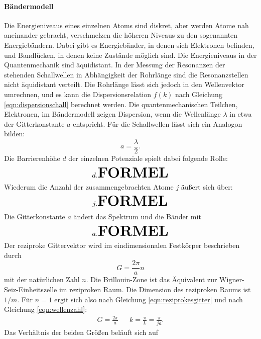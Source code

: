 \paragraph{Bändermodell}
Die Energieniveaus eines einzelnen Atoms sind diskret, aber werden Atome nah aneinander gebracht, verschmelzen die höheren Niveaus zu den sogenannten Energiebändern.
Dabei gibt es Energiebänder, in denen sich Elektronen befinden, und Bandlücken, in denen keine Zustände möglich sind.
Die Energieniveaus in der Quantenmechanik sind äquidistant.
In der Messung der Resonanzen der stehenden Schallwellen in Abhängigkeit der Rohrlänge sind die Resonanzstellen nicht äquidistant verteilt.
Die Rohrlänge lässt sich jedoch in den Wellenvektor umrechnen, und es kann die Dispersionsrelation $f(k)$ nach Gleichung \eqref{eqn:dispersionschall} berechnet werden.
Die quantenmechanischen Teilchen, Elektronen, im Bändermodell zeigen Dispersion, wenn die Wellenlänge $\lambda$ in etwa der Gitterkonstante $a$ entspricht.
Für die Schallwellen lässt sich ein Analogon bilden:
\begin{equation}
  a = \frac{\lambda}{2}.
\end{equation}
Die Barrierenhöhe $d$ der einzelnen Potenziale spielt dabei folgende Rolle:
\begin{equation}
  d. \textbf{\huge{FORMEL}}
\end{equation}
Wiederum die Anzahl der zusammengebrachten Atome $j$ äußert sich über:
\begin{equation}
  j. \huge{\textbf{FORMEL}}
\end{equation}
Die Gitterkonstante $a$ ändert das Spektrum und die Bänder mit
\begin{equation}
  a. \huge{\textbf{FORMEL}}
\end{equation}
Der reziproke Gittervektor wird im eindimensionalen Festkörper beschrieben durch
\begin{equation}
  G= \frac{2 \pi }{a} n
  \label{eqn:reziprokesgitter}
\end{equation}
mit der natürlichen Zahl $n$.
Die Brillouin-Zone ist das Äquivalent zur Wigner-Seiz-Einheitszelle im reziproken Raum.
Die Dimension des reziproken Raums ist $\si{1/m}$.
Für $n=1$ ergit sich also nach Gleichung \eqref{eqn:reziprokesgitter} und nach Gleichung \eqref{eqn:wellenzahl}:
\begin{align}
  G= \frac{2 \pi }{a}  && k = \frac{ \pi }{L} = \frac{\pi}{ j a}.
  \label{eqn:unsergitter}
\end{align}
Das Verhältnis der beiden Größen beläuft sich auf
